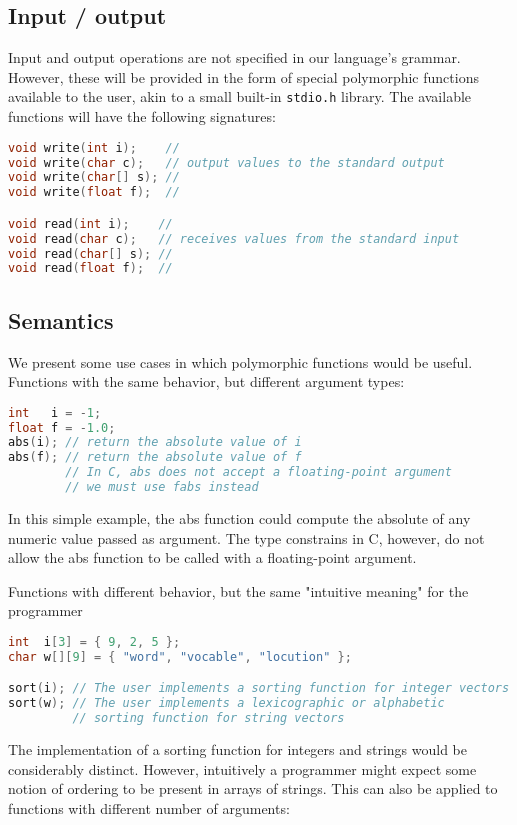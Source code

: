 \subsection{Input / output}
Input and output operations are not specified in our language's grammar. However, these will be provided
in the form of special polymorphic functions available to the user, akin to a small built-in
\texttt{stdio.h} library. The available functions will have the following signatures:

\begin{lstlisting}[language=C]
void write(int i);    //
void write(char c);   // output values to the standard output
void write(char[] s); //
void write(float f);  //

void read(int i);    //
void read(char c);   // receives values from the standard input
void read(char[] s); //
void read(float f);  //
\end{lstlisting}

\subsection{Semantics}
We present some use cases in which polymorphic functions would be useful. Functions with the same behavior, but different argument types:

\begin{lstlisting}[language=C]
int   i = -1;
float f = -1.0;
abs(i); // return the absolute value of i
abs(f); // return the absolute value of f
        // In C, abs does not accept a floating-point argument
        // we must use fabs instead
\end{lstlisting}

In this simple example, the abs function could compute the absolute of any numeric value passed as argument. The type constrains in C, however, do not allow the abs function to be called with a floating-point argument.

Functions with different behavior, but the same "intuitive meaning" for the programmer

\begin{lstlisting}[language=C]
int  i[3] = { 9, 2, 5 };
char w[][9] = { "word", "vocable", "locution" };

sort(i); // The user implements a sorting function for integer vectors
sort(w); // The user implements a lexicographic or alphabetic
         // sorting function for string vectors
\end{lstlisting}

The implementation of a sorting function for integers and strings would be considerably distinct. However, intuitively a programmer might expect some notion of ordering to be present in arrays of strings. This can also be applied to functions with different number of arguments:

